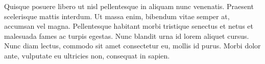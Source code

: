 \documentclass[12pt]{article}
\begin{document}
Quisque posuere libero ut nisl pellentesque in aliquam nunc venenatis. Praesent scelerisque mattis interdum. Ut massa enim, bibendum vitae semper at, accumsan vel magna. Pellentesque habitant morbi tristique senectus et netus et malesuada fames ac turpis egestas. Nunc blandit urna id lorem aliquet cursus. Nunc diam lectus, commodo sit amet consectetur eu, mollis id purus. Morbi dolor ante, vulputate eu ultricies non, consequat in sapien.

\end{document}
